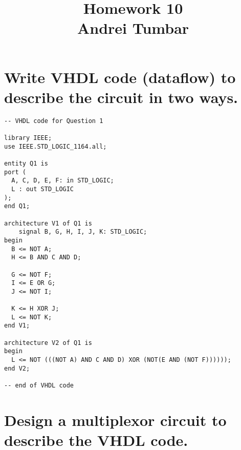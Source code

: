 \documentclass[twoside,11pt]{article}
\newcommand\assignmentNumber{10}
\newcommand\studentName{Andrei Tumbar}
\begin{document}
\title{\vspace{-3cm}Homework \assignmentNumber\\\studentName\vspace{-2cm}}
\maketitle
\vspace{-5cm}

\section{Write VHDL code (dataflow) to describe the circuit in two ways.}
\label{sec:background}


\begin{verbatim}
-- VHDL code for Question 1

library IEEE;
use IEEE.STD_LOGIC_1164.all;

entity Q1 is
port (
  A, C, D, E, F: in STD_LOGIC;
  L : out STD_LOGIC
);
end Q1;

architecture V1 of Q1 is
	signal B, G, H, I, J, K: STD_LOGIC;
begin
  B <= NOT A;
  H <= B AND C AND D;

  G <= NOT F;
  I <= E OR G;
  J <= NOT I;

  K <= H XOR J;
  L <= NOT K;
end V1;

architecture V2 of Q1 is
begin
  L <= NOT (((NOT A) AND C AND D) XOR (NOT(E AND (NOT F))))));
end V2;

-- end of VHDL code

\end{verbatim}
\pagebreak

\section{Design a multiplexor circuit to describe the VHDL code.}

\begin{figure}[h!]
	\begin{center}
	\end{center}
\end{figure}
\end{document}
